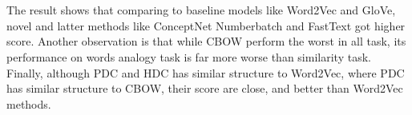 \documentclass[a4paper, 11pt]{article}
\begin{document}
\\ \hspace*{\fill} \\
\noindent
The result shows that comparing to baseline models like Word2Vec and GloVe, novel and latter methods like ConceptNet Numberbatch and FastText got higher score. Another observation is that while CBOW perform the worst in all task, its performance on words analogy task is far more worse than similarity task. Finally, although PDC and HDC has similar structure to Word2Vec, where PDC has similar structure to CBOW, their score are close, and better than Word2Vec methods.
\end{document}
